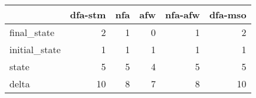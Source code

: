 \begin{tabular}{lrrrrr}
\toprule
{} &  dfa-stm &  nfa &  afw &  nfa-afw &  dfa-mso \\
\midrule
final\_state   &        2 &    1 &    0 &        1 &        2 \\
initial\_state &        1 &    1 &    1 &        1 &        1 \\
state         &        5 &    5 &    4 &        5 &        5 \\
delta         &       10 &    8 &    7 &        8 &       10 \\
\bottomrule
\end{tabular}
